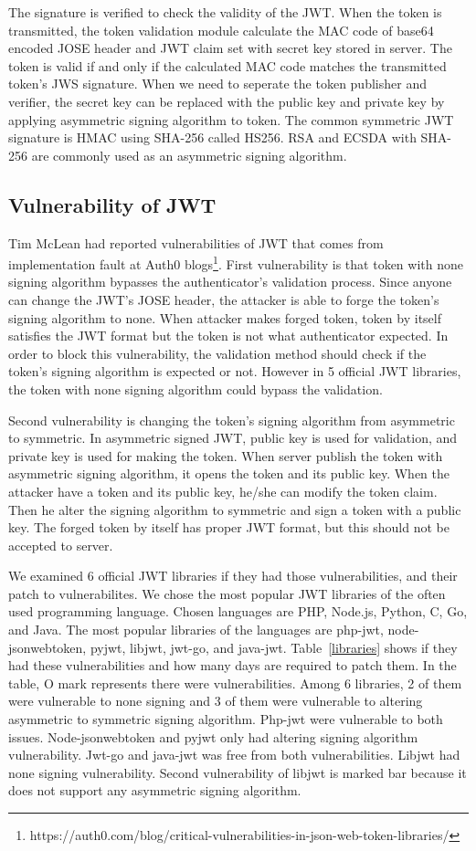 \documentclass[journal,article,submit,moreauthors,pdftex,10pt,a4paper]{mdpi}
\begin{document}
The signature is verified to check the validity of the JWT. When the token is transmitted, the token validation module calculate the MAC code of base64 encoded JOSE header and JWT claim set with secret key stored in server. The token is valid if and only if the calculated MAC code matches the transmitted token's JWS signature. When we need to seperate the token publisher and verifier, the secret key can be replaced with the public key and private key by applying asymmetric signing algorithm to token. The common symmetric JWT signature is HMAC using SHA-256 called HS256. RSA and ECSDA with SHA-256 are commonly used as an asymmetric signing algorithm.

\subsection{Vulnerability of JWT}

Tim McLean had reported vulnerabilities of JWT that comes from implementation fault at Auth0 blogs\footnote{https://auth0.com/blog/critical-vulnerabilities-in-json-web-token-libraries/}. First vulnerability is that token with none signing algorithm bypasses the authenticator's validation process. Since anyone can change the JWT's JOSE header, the attacker is able to forge the token's signing algorithm to none. When attacker makes forged token, token by itself satisfies the JWT format but the token is not what authenticator expected. In order to block this vulnerability, the validation method should check if the token's signing algorithm is expected or not. However in 5 official JWT libraries, the token with none signing algorithm could bypass the validation.

Second vulnerability is changing the token's signing algorithm from asymmetric to symmetric. In asymmetric signed JWT, public key is used for validation, and private key is used for making the token. When server publish the token with asymmetric signing algorithm, it opens the token and its public key. When the attacker have a token and its public key, he/she can modify the token claim. Then he alter the signing algorithm to symmetric and sign a token with a public key. The forged token by itself has proper JWT format, but this should not be accepted to server.

We examined 6 official JWT libraries if they had those vulnerabilities, and their patch to vulnerabilites. We chose the most popular JWT libraries of the often used programming language. Chosen languages are PHP, Node.js, Python, C, Go, and Java. The most popular libraries of the languages are php-jwt, node-jsonwebtoken, pyjwt, libjwt, jwt-go, and java-jwt. Table~\ref{libraries} shows if they had these vulnerabilities and how many days are required to patch them. In the table, O mark represents there were vulnerabilities. Among 6 libraries, 2 of them were vulnerable to none signing and 3 of them were vulnerable to altering asymmetric to symmetric signing algorithm. Php-jwt were vulnerable to both issues. Node-jsonwebtoken and pyjwt only had altering signing algorithm vulnerability. Jwt-go and java-jwt was free from both vulnerabilities. Libjwt had none signing vulnerability. Second vulnerability of libjwt is marked bar because it does not support any asymmetric signing algorithm.
\end{document}
